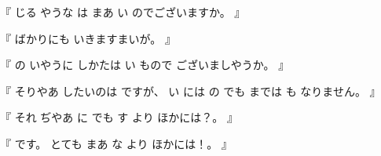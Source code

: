 %
『
じる
やうな
は
まあ
い
のでございますか。
』

%
『
ばかりにも
いきますまいが。
』

%
『
の
いやうに
しかたは
い
もので
ございましやうか。
』

%
『
そりやあ
したいのは
ですが、
%
い
には
の
でも%
までは
も
なりません。
』

%
『
それ
ぢやあ
に
でも
す
より
ほかには？。
』

%
『
です。
%
とても
まあ
な
より
ほかには！。
』

